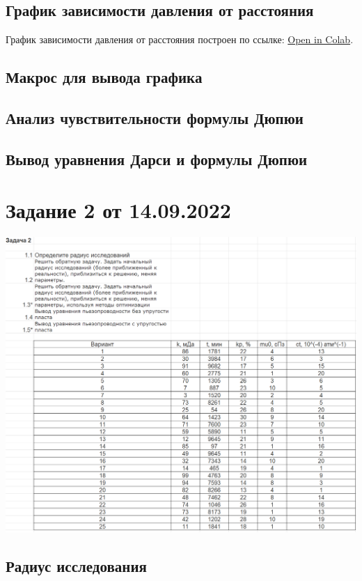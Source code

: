 \documentclass[a4paper,12pt]{article}
\begin{document}
\subsection{График зависимости давления от расстояния}

График зависимости давления от расстояния построен по ссылке: \href{https://colab.research.google.com/github/mualal/notebooks-source/blob/master/6_pressure.ipynb}{Open in Colab}.

\subsection{Макрос для вывода графика}

\subsection{Анализ чувствительности формулы Дюпюи}

\subsection{Вывод уравнения Дарси и формулы Дюпюи}

\section{Задание 2 от 14.09.2022}
\includegraphics[width=\textwidth]{task2}

\subsection{Радиус исследования}
\end{document}

